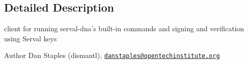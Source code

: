 \subsection{Detailed Description}
client for running serval-\/dna's built-\/in commands and signing and verification using Serval keys \begin{DoxyAuthor}{Author}
Dan Staples (dismantl), \href{mailto:danstaples@opentechinstitute.org}{\tt danstaples@opentechinstitute.\-org} 
\end{DoxyAuthor}
